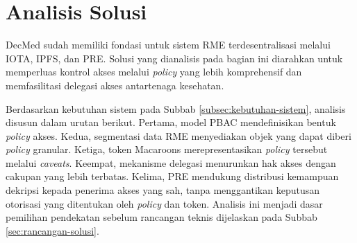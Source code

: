 \section{Analisis Solusi}
\label{sec:analisis-solusi}

DecMed sudah memiliki fondasi untuk sistem RME terdesentralisasi melalui IOTA, IPFS, dan PRE. Solusi yang dianalisis pada bagian ini diarahkan untuk memperluas kontrol akses melalui \textit{policy} yang lebih komprehensif dan memfasilitasi delegasi akses antartenaga kesehatan.

Berdasarkan kebutuhan sistem pada Subbab \ref{subsec:kebutuhan-sistem}, analisis disusun dalam urutan berikut. Pertama, model PBAC mendefinisikan bentuk \textit{policy} akses. Kedua, segmentasi data RME menyediakan objek yang dapat diberi \textit{policy} granular. Ketiga, token Macaroons merepresentasikan \textit{policy} tersebut melalui \textit{caveats}. Keempat, mekanisme delegasi menurunkan hak akses dengan cakupan yang lebih terbatas. Kelima, PRE mendukung distribusi kemampuan dekripsi kepada penerima akses yang sah, tanpa menggantikan keputusan otorisasi yang ditentukan oleh \textit{policy} dan token. Analisis ini menjadi dasar pemilihan pendekatan sebelum rancangan teknis dijelaskan pada Subbab \ref{sec:rancangan-solusi}.







